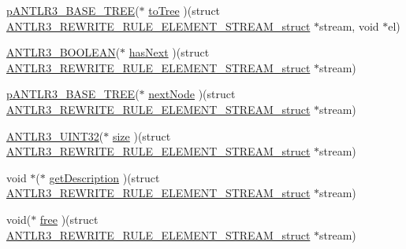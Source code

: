 \begin{DoxyCompactItemize}
\item 
\hyperlink{antlr3interfaces_8h_a6313a8a3e8f044398a393bd10c083852}{p\-A\-N\-T\-L\-R3\-\_\-\-B\-A\-S\-E\-\_\-\-T\-R\-E\-E}($\ast$ \hyperlink{struct_a_n_t_l_r3___r_e_w_r_i_t_e___r_u_l_e___e_l_e_m_e_n_t___s_t_r_e_a_m__struct_ab4e1cbf7d9e92987d53c9f9b835f0eeb}{to\-Tree} )(struct \hyperlink{struct_a_n_t_l_r3___r_e_w_r_i_t_e___r_u_l_e___e_l_e_m_e_n_t___s_t_r_e_a_m__struct}{A\-N\-T\-L\-R3\-\_\-\-R\-E\-W\-R\-I\-T\-E\-\_\-\-R\-U\-L\-E\-\_\-\-E\-L\-E\-M\-E\-N\-T\-\_\-\-S\-T\-R\-E\-A\-M\-\_\-struct} $\ast$stream, void $\ast$el)
\item 
\hyperlink{antlr3defs_8h_a5b33dccbba3b7212539695e21df4079b}{A\-N\-T\-L\-R3\-\_\-\-B\-O\-O\-L\-E\-A\-N}($\ast$ \hyperlink{struct_a_n_t_l_r3___r_e_w_r_i_t_e___r_u_l_e___e_l_e_m_e_n_t___s_t_r_e_a_m__struct_adb77b4789ff891dfcafa00b3cccf8f58}{has\-Next} )(struct \hyperlink{struct_a_n_t_l_r3___r_e_w_r_i_t_e___r_u_l_e___e_l_e_m_e_n_t___s_t_r_e_a_m__struct}{A\-N\-T\-L\-R3\-\_\-\-R\-E\-W\-R\-I\-T\-E\-\_\-\-R\-U\-L\-E\-\_\-\-E\-L\-E\-M\-E\-N\-T\-\_\-\-S\-T\-R\-E\-A\-M\-\_\-struct} $\ast$stream)
\item 
\hyperlink{antlr3interfaces_8h_a6313a8a3e8f044398a393bd10c083852}{p\-A\-N\-T\-L\-R3\-\_\-\-B\-A\-S\-E\-\_\-\-T\-R\-E\-E}($\ast$ \hyperlink{struct_a_n_t_l_r3___r_e_w_r_i_t_e___r_u_l_e___e_l_e_m_e_n_t___s_t_r_e_a_m__struct_aecd854145796216efc9c57b3960abfa4}{next\-Node} )(struct \hyperlink{struct_a_n_t_l_r3___r_e_w_r_i_t_e___r_u_l_e___e_l_e_m_e_n_t___s_t_r_e_a_m__struct}{A\-N\-T\-L\-R3\-\_\-\-R\-E\-W\-R\-I\-T\-E\-\_\-\-R\-U\-L\-E\-\_\-\-E\-L\-E\-M\-E\-N\-T\-\_\-\-S\-T\-R\-E\-A\-M\-\_\-struct} $\ast$stream)
\item 
\hyperlink{antlr3defs_8h_ac41f744abd0fd25144b9eb9d11b1dfd1}{A\-N\-T\-L\-R3\-\_\-\-U\-I\-N\-T32}($\ast$ \hyperlink{struct_a_n_t_l_r3___r_e_w_r_i_t_e___r_u_l_e___e_l_e_m_e_n_t___s_t_r_e_a_m__struct_ac1c8e6814f647b356c1e1b77e3e589fd}{size} )(struct \hyperlink{struct_a_n_t_l_r3___r_e_w_r_i_t_e___r_u_l_e___e_l_e_m_e_n_t___s_t_r_e_a_m__struct}{A\-N\-T\-L\-R3\-\_\-\-R\-E\-W\-R\-I\-T\-E\-\_\-\-R\-U\-L\-E\-\_\-\-E\-L\-E\-M\-E\-N\-T\-\_\-\-S\-T\-R\-E\-A\-M\-\_\-struct} $\ast$stream)
\item 
void $\ast$($\ast$ \hyperlink{struct_a_n_t_l_r3___r_e_w_r_i_t_e___r_u_l_e___e_l_e_m_e_n_t___s_t_r_e_a_m__struct_a6eb5f2121bfbe1d52e0fbb8f760f4485}{get\-Description} )(struct \hyperlink{struct_a_n_t_l_r3___r_e_w_r_i_t_e___r_u_l_e___e_l_e_m_e_n_t___s_t_r_e_a_m__struct}{A\-N\-T\-L\-R3\-\_\-\-R\-E\-W\-R\-I\-T\-E\-\_\-\-R\-U\-L\-E\-\_\-\-E\-L\-E\-M\-E\-N\-T\-\_\-\-S\-T\-R\-E\-A\-M\-\_\-struct} $\ast$stream)
\item 
void($\ast$ \hyperlink{struct_a_n_t_l_r3___r_e_w_r_i_t_e___r_u_l_e___e_l_e_m_e_n_t___s_t_r_e_a_m__struct_ae77c76a2570b6ef4f40146b33ad4c04a}{free} )(struct \hyperlink{struct_a_n_t_l_r3___r_e_w_r_i_t_e___r_u_l_e___e_l_e_m_e_n_t___s_t_r_e_a_m__struct}{A\-N\-T\-L\-R3\-\_\-\-R\-E\-W\-R\-I\-T\-E\-\_\-\-R\-U\-L\-E\-\_\-\-E\-L\-E\-M\-E\-N\-T\-\_\-\-S\-T\-R\-E\-A\-M\-\_\-struct} $\ast$stream)
\end{DoxyCompactItemize}


